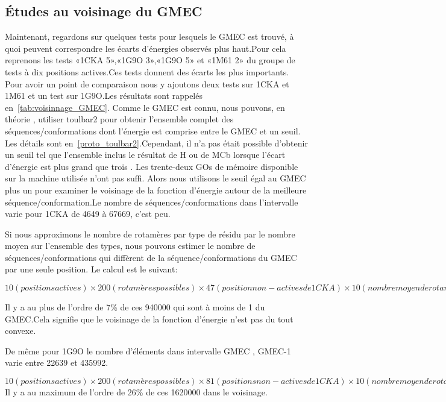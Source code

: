 \clearpage
   \subsection{Études au voisinage du GMEC}

Maintenant, regardons sur quelques tests pour lesquels le GMEC est trouvé, à quoi peuvent correspondre les écarts d'énergies observés plus haut.Pour cela reprenons les tests «1CKA 5»,«1G9O 3»,«1G9O 5» et «1M61 2» du groupe de tests à dix positions actives.Ces tests donnent des écarts les plus importants. Pour avoir un point de comparaison nous y ajoutons deux tests sur 1CKA et 1M61 et un test sur 1G9O.Les résultats sont rappelés en~\ref{tab:voisinnage_GMEC}. Comme le GMEC est connu, nous pouvons, en théorie , utiliser toulbar2 pour obtenir l'ensemble complet des séquences/conformations dont l'énergie est comprise entre le GMEC et un seuil. Les détails sont en~\ref{proto_toulbar2}.Cependant, il n'a pas était possible d'obtenir un seuil tel que l'ensemble inclus le résultat de H ou de MCb lorsque l'écart d'énergie est plus grand que trois . Les trente-deux GOs de mémoire disponible sur la machine utilisée n'ont pas suffi. Alors nous utilisons le seuil égal au GMEC plus un pour examiner le voisinage de la fonction d'énergie autour de la meilleure séquence/conformation.Le nombre de séquences/conformations dans l'intervalle varie pour 1CKA de 4649 à 67669, c'est peu. 

Si nous approximons le nombre de rotamères par type de résidu par le nombre moyen sur l'ensemble des types, nous pouvons estimer le nombre de séquences/conformations qui diffèrent de la séquence/conformations du GMEC par une seule position. Le calcul est le suivant:

$10 (positions actives) \times 200 (rotamères possibles) \times 47 (position non-actives de 1CKA) \times 10 (nombre moyen de rotamères par résidu)=940000 $

Il y a au plus de l'ordre de 7\% de ces 940000 qui sont à moins de 1 du GMEC.Cela signifie que le voisinage de la fonction d'énergie n'est pas du tout convexe.


De même pour 1G9O le nombre d'éléments dans intervalle GMEC , GMEC-1 varie entre 22639 et 435992.


$10 (positions  actives) \times 200 (rotamères  possibles) \times 81 (positions  non-actives de 1CKA) \times 10 (nombre  moyen  de  rotamères  par  résidu)=1620000 $
Il y a au maximum de l'ordre de 26\% de ces 1620000 dans le voisinage.

